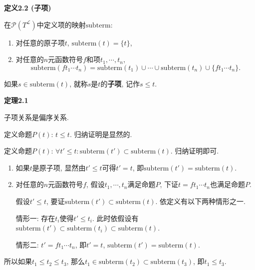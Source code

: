 \hypertarget{sec:定义2.2}{}
\noindent\textbf{定义2.2 (子项)}

在$\mathcal{P}(T^{\mathcal{L}})$中定义项的映射$\mathrm{subterm}$:
\begin{enumerate}
    \item 对任意的原子项$t$, $\mathrm{subterm}(t)=\{t\}$,
    \item 对任意的$n$元函数符号$f$和项$t_1,\cdots,t_n$,
    \[
        \mathrm{subterm}(ft_1\cdots t_n)=\mathrm{subterm}(t_1)\cup\cdots\cup
        \mathrm{subterm}(t_n)\cup\{ft_1\cdots t_n\}.
    \]
\end{enumerate}

如果$s\in\mathrm{subterm}(t)$, 就称$s$是$t$的\textbf{子项}, 记作$s\leqslant t$.

\vspace{10pt}

\hypertarget{sec:定理2.1}{}
\noindent\textbf{定理2.1}

子项关系是偏序关系.



定义命题$P(t)$: $t\leqslant t$. 归纳证明是显然的.


定义命题$P(t)$: $\forall t'\leqslant t:
\mathrm{subterm}(t')\subset\mathrm{subterm}(t)$. 归纳证明即可.

\begin{enumerate}
    \item 如果$t$是原子项, 显然由$t'\leqslant t$可得$t'=t$,
    即$\mathrm{subterm}(t')=\mathrm{subterm}(t)$.
    \item 对任意的$n$元函数符号$f$, 假设$t_1,\cdots,t_n$满足命题$P$,
    下证$t=ft_1\cdots t_n$也满足命题$P$.

    \hspace{2.17em}
    假设$t'\leqslant t$, 要证$\mathrm{subterm}(t')\subset\mathrm{subterm}(t)$.
    依定义有以下两种情形之一.

    \hspace{2.17em}
    情形一: 存在$t_i$使得$t'\leqslant t_i$. 此时依假设有
    $\mathrm{subterm}(t')\subset\mathrm{subterm}(t_i)\subset\mathrm{subterm}(t)$.

    \hspace{2.17em}
    情形二: $t'=ft_1\cdots t_n$, 即$t'=t$, $\mathrm{subterm}(t')=\mathrm{subterm}(t)$.
\end{enumerate}

所以如果$t_1\leqslant t_2\leqslant t_3$,
那么$t_1\in\mathrm{subterm}(t_2)\subset\mathrm{subterm}(t_3)$, 即$t_1\leqslant t_3$.


